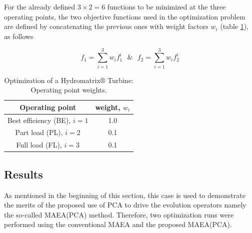 \newpage

For the already defined $3\!\times\!2\!=\!6$ functions to be minimized at the three operating points, the two objective functions used in the optimization problem are defined by concatenating the previous ones with weight factors $w_i$ (table \ref{weights}), as follows

\begin{equation} 
f_1=\sum^3_{i=1}w_if_1^i ~~~\&~~~ f_2=\sum^3_{i=1}w_if_2^i
\label{F12}
\end{equation}


\begin{table}[h!]
\begin{center}
\begin{tabular}{ |c|c| }
\hline
Operating point & weight, $w_i$\\
\hline
Best efficiency (BE), $i\!=\!1$  & 1.0\\
\hline
Part load  (PL), $i\!=\!2$ & 0.1\\
\hline
Full load (FL), $i\!=\!3$  & 0.1\\
\hline
\end{tabular}
\caption{Optimization of a Hydromatrix$\circledR$ Turbine: Operating point weights.}
\label{weights}
\end{center}
\end{table}


\subsection{Results}
As mentioned in the beginning of this section, this case is used to demonstrate the merits of the proposed use of PCA to drive the evolution operators namely the so-called MAEA(PCA) method. Therefore, two optimization runs were performed using the conventional MAEA and the proposed MAEA(PCA).

